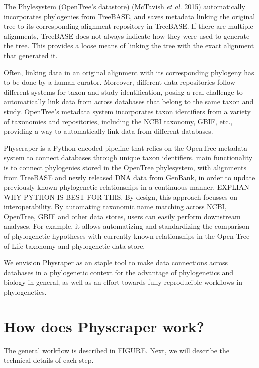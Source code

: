 \documentclass[]{article}
\begin{document}
The Phylesystem (OpenTree's datastore) (McTavish \emph{et al.} \protect\hyperlink{ref-mctavish2015phylesystem}{2015}) automatically incorporates phylogenies from TreeBASE, and saves metadata linking the original tree to its corresponding alignment repository in TreeBASE. If there are multiple alignments, TreeBASE does not always indicate how they were used to generate the tree. This provides a loose means of linking the tree with the exact alignment that generated it.

Often, linking data in an original alignment with its corresponding phylogeny has to be done by a human curator.
Moreover, different data repositories follow different systems for taxon and study identification, posing a real challenge to automatically link data from across databases that belong to the same taxon and study.
OpenTree's metadata system incorporates taxon identifiers from a variety of taxonomies and repositories, including the NCBI taxonomy, GBIF, etc., providing a way to automatically link data from different databases.

Physcraper is a Python encoded pipeline that relies on the OpenTree metadata system to connect databases through unique taxon identifiers.
main functionality is to connect phylogenies stored in the OpenTree phylesystem, with alignments from TreeBASE and newly released DNA data from GenBank, in order to update previously known phylogenetic relationships in a continuous manner.
EXPLIAN WHY PYTHON IS BEST FOR THIS.
By design, this approach focusses on interoperability. By automating taxonomic name matching across NCBI, OpenTree, GBIF and other data stores, users can easily perform downstream analyses.
For example, it allows automatizing and standardizing the comparison of phylogenetic hypotheses with currently known relationships in the Open Tree of Life taxonomy and phylogenetic data store.

We envision Physraper as an staple tool to make data connections across databases in a phylogenetic context for the advantage of phylogenetics and biology in general, as well as an effort towards fully reproducible workflows in phylogenetics.

\hypertarget{how-does-physcraper-work}{%
\section{How does Physcraper work?}\label{how-does-physcraper-work}}

The general workflow is described in FIGURE. Next, we will describe the technical details of each step.
\end{document}
